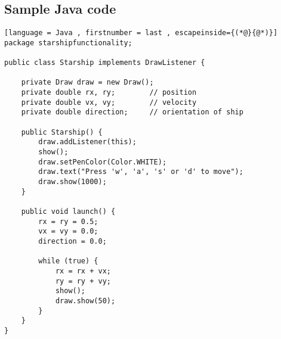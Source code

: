 \subsection{Sample Java code}


\begin{lstlisting}[language = Java , firstnumber = last , escapeinside={(*@}{@*)}]
package starshipfunctionality;

public class Starship implements DrawListener {
   
    private Draw draw = new Draw();
    private double rx, ry;        // position
    private double vx, vy;        // velocity
    private double direction;     // orientation of ship

    public Starship() {
        draw.addListener(this);
        show();
        draw.setPenColor(Color.WHITE);
        draw.text("Press 'w', 'a', 's' or 'd' to move");
        draw.show(1000);
    }

    public void launch() {
        rx = ry = 0.5;
        vx = vy = 0.0;
        direction = 0.0;

        while (true) {
            rx = rx + vx;
            ry = ry + vy;
            show();
            draw.show(50);
        }
    }
}
\end{lstlisting}
